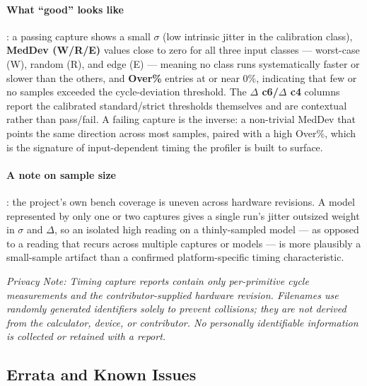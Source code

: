 \documentclass[titlepage]{report}
\begin{document}
	\paragraph{What ``good'' looks like}: a passing capture shows a small \textbf{$\sigma$} (low intrinsic jitter in the calibration class), \textbf{MedDev (W/R/E)} values close to zero for all three input classes --- worst-case (W), random (R), and edge (E) --- meaning no class runs systematically faster or slower than the others, and \textbf{Over\%} entries at or near $0\%$, indicating that few or no samples exceeded the cycle-deviation threshold. The \textbf{$\Delta$ c6/$\Delta$ c4} columns report the calibrated standard/strict thresholds themselves and are contextual rather than pass/fail. A failing capture is the inverse: a non-trivial MedDev that points the same direction across most samples, paired with a high Over\%, which is the signature of input-dependent timing the profiler is built to surface.

	\paragraph{A note on sample size}: the project's own bench coverage is uneven across hardware revisions. A model represented by only one or two captures gives a single run's jitter outsized weight in \textbf{$\sigma$} and \textbf{$\Delta$}, so an isolated high reading on a thinly-sampled model --- as opposed to a reading that recurs across multiple captures or models --- is more plausibly a small-sample artifact than a confirmed platform-specific timing characteristic.


	\textit{Privacy Note: Timing capture reports contain only per-primitive cycle measurements and the contributor-supplied hardware revision. Filenames use randomly generated identifiers solely to prevent collisions; they are not derived from the calculator, device, or contributor. No personally identifiable information is collected or retained with a report.}

	\newpage


	\subsection{Errata and Known Issues}\label{ssec:errata}\label{ssec:engineering_notes}\label{ssec:known_issues}
\end{document}
